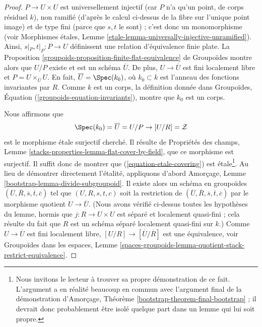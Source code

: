 \begin{proof}
$P \to U \times U$ est universellement injectif (car $P$ n'a qu'un point,
de corps résiduel $k$), non ramifié (d'après le calcul ci-dessus de la fibre
sur l'unique point image) et de type fini (parce que $s, t$ le sont) ; c'est
donc un monomorphisme (voir Morphismes étales, Lemme
\ref{etale-lemma-universally-injective-unramified}).
Ainsi, $s|_P, t|_P : P \to U$ définissent une relation d'équivalence finie
plate. La Proposition \ref{groupoids-proposition-finite-flat-equivalence} de
Groupoïdes montre alors que $U/P$ existe et est un schéma $\overline{U}$.
De plus, $U \to \overline{U}$ est fini localement libre et
$P = U \times_{\overline{U}} U$.
En fait, $\overline{U} = \Spec(k_0)$, où $k_0 \subset k$ est l'anneau des
fonctions invariantes par $R$. Comme $k$ est un corps, la définition donnée
dans Groupoïdes, Équation (\ref{groupoids-equation-invariants}), montre que
$k_0$ est un corps.

\medskip\noindent
Nous affirmons que
\begin{equation}
\label{equation-etale-covering}
\Spec(k_0) = \overline{U} = U/P \to [U/R] = \mathcal{Z}
\end{equation}
est le morphisme étale surjectif cherché. Il résulte de Propriétés des champs,
Lemme \ref{stacks-properties-lemma-flat-cover-by-field}, que ce morphisme est
surjectif. Il suffit donc de montrer que (\ref{equation-etale-covering}) est
étale\footnote{Nous invitons le lecteur à trouver sa propre démonstration de
ce fait. L'argument a en réalité beaucoup en commun avec l'argument final de
la démonstration d'Amorçage, Théorème
\ref{bootstrap-theorem-final-bootstrap} ; il devrait donc probablement être
isolé quelque part dans un lemme qui lui soit propre.}.
Au lieu de démontrer directement l'étalité, appliquons d'abord Amorçage,
Lemme \ref{bootstrap-lemma-divide-subgroupoid}. Il existe alors un schéma en
groupoïdes
$(\overline{U}, \overline{R}, \overline{s}, \overline{t}, \overline{c})$
tel que $(U, R, s, t, c)$ soit la restriction de
$(\overline{U}, \overline{R}, \overline{s}, \overline{t}, \overline{c})$
par le morphisme quotient $U \to \overline{U}$.
(Nous avons vérifié ci-dessus toutes les hypothèses du lemme, hormis que
$j : R \to U \times U$ est séparé et localement quasi-fini ; cela résulte du
fait que $R$ est un schéma séparé localement quasi-fini sur $k$.) Comme
$U \to \overline{U}$ est fini localement libre,
$[U/R] \to [\overline{U}/\overline{R}]$ est une équivalence, voir Groupoïdes
dans les espaces,
Lemme \ref{spaces-groupoids-lemma-quotient-stack-restrict-equivalence}.


\end{proof}
